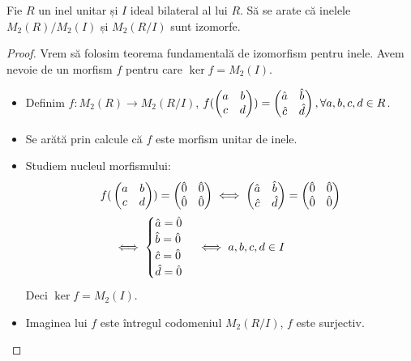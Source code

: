 \begin{exercise}[4.9]
Fie \(R\) un inel unitar și \(I\) ideal bilateral al lui \(R\).
Să se arate că inelele \(M_2(R)/M_2(I)\) și \(M_2(R/I)\) sunt izomorfe.
\end{exercise}
\begin{proof}
Vrem să folosim teorema fundamentală de izomorfism pentru inele. Avem nevoie de un morfism \(f\) pentru care \(\ker f = M_2(I)\).

\begin{itemize}
    \item Definim \(f \colon M_2(R) \to M_2(R/I)\), \(f(\begin{pmatrix}a & b \\ c & d\end{pmatrix}) = \begin{pmatrix}\Hat{a} & \Hat{b} \\ \Hat{c} & \Hat{d}\end{pmatrix}, \forall a, b, c, d \in R\).
    \item Se arătă prin calcule că \(f\) este morfism unitar de inele.
    \item Studiem nucleul morfismului:
    \begin{align*}
        f(&\begin{pmatrix}a & b \\ c & d\end{pmatrix}) = \begin{pmatrix}\Hat{0} & \Hat{0} \\ \Hat{0} & \Hat{0}\end{pmatrix}
        \iff
        \begin{pmatrix}\Hat{a} & \Hat{b} \\ \Hat{c} & \Hat{d}\end{pmatrix} = \begin{pmatrix}\Hat{0} & \Hat{0} \\ \Hat{0} & \Hat{0}\end{pmatrix} \\
        &\iff
        \begin{cases}
        \Hat{a} = \Hat{0} \\
        \Hat{b} = \Hat{0} \\
        \Hat{c} = \Hat{0} \\
        \Hat{d} = \Hat{0} \\
        \end{cases}
        \iff
        a, b, c, d \in I
    \end{align*}
    Deci \(\ker f = M_2(I)\).
    \item Imaginea lui \(f\) este întregul codomeniul \(M_2(R/I)\), \(f\) este surjectiv.
    

\end{itemize}
\end{proof}
